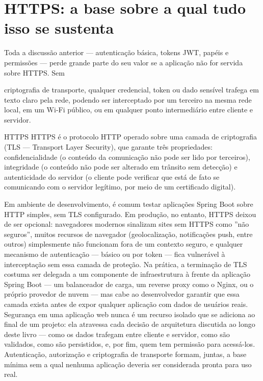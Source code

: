 \section{HTTPS: a base sobre a qual tudo isso se sustenta}

Toda a discussão anterior — autenticação básica, tokens JWT, papéis e permissões — perde grande parte do seu valor se a aplicação não for servida sobre HTTPS. Sem

criptografia de transporte, qualquer credencial, token ou dado sensível trafega em texto claro pela rede, podendo ser interceptado por um terceiro na mesma rede local, em um Wi-Fi público, ou em qualquer ponto intermediário entre cliente e servidor.

\begin{infobox}{HTTPS}
HTTPS é o protocolo HTTP operado sobre uma camada de criptografia (TLS — Transport Layer Security), que garante três propriedades: confidencialidade (o conteúdo da comunicação não pode ser lido por terceiros), integridade (o conteúdo não pode ser alterado em trânsito sem detecção) e autenticidade do servidor (o cliente pode verificar que está de fato se comunicando com o servidor legítimo, por meio de um certificado digital).
\end{infobox}

Em ambiente de desenvolvimento, é comum testar aplicações Spring Boot sobre HTTP simples, sem TLS configurado. Em produção, no entanto, HTTPS deixou de ser opcional: navegadores modernos sinalizam sites sem HTTPS como ”não seguros”, muitos recursos de navegador (geolocalização, notificações push, entre outros) simplesmente não funcionam fora de um contexto seguro, e qualquer mecanismo de autenticação — básico ou por token — fica vulnerável à interceptação sem essa camada de proteção. Na prática, a terminação de TLS costuma ser delegada a um componente de infraestrutura à frente da aplicação Spring Boot — um balanceador de carga, um reverse proxy como o Nginx, ou o próprio provedor de nuvem — mas cabe ao desenvolvedor garantir que essa camada exista antes de expor qualquer aplicação com dados de usuários reais. Segurança em uma aplicação web nunca é um recurso isolado que se adiciona ao final de um projeto: ela atravessa cada decisão de arquitetura discutida ao longo deste livro — como os dados trafegam entre cliente e servidor, como são validados, como são persistidos, e, por fim, quem tem permissão para acessá-los. Autenticação, autorização e criptografia de transporte formam, juntas, a base mínima sem a qual nenhuma aplicação deveria ser considerada pronta para uso real.

